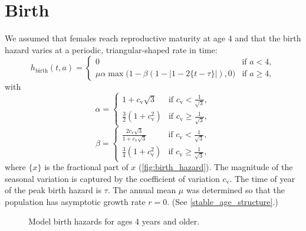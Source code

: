 \documentclass[12pt]{article}
\begin{document}
\section{Birth}

We assumed that females reach reproductive maturity at age $4$ and
that the birth hazard varies at a periodic, triangular-shaped rate in
time:
\begin{equation}
  h_{\text{birth}}(t, a) =
  \begin{cases}
    0 & \text{if $a < 4$},
    \\
    \mu \alpha \max\big(1 - \beta (1 - |1 - 2 \{t - \tau\}|), 0\big)
    & \text{if $a \geq 4$},
  \end{cases}
\end{equation}
with
\begin{equation}
  \alpha =
  \begin{cases}
    1 + c_{\text{v}} \sqrt{3}
    & \text{if $c_{\text{v}} < \frac{1}{\sqrt{3}}$},
    \\
    \frac{3}{2} \left(1 + c_{\text{v}}^2\right)
    & \text{if $c_{\text{v}} \geq \frac{1}{\sqrt{3}}$},
  \end{cases}
\end{equation}
\begin{equation}
  \beta =
  \begin{cases}
    \frac{2 c_{\text{v}} \sqrt{3}}{1 + c_{\text{v}} \sqrt{3}}
    & \text{if $c_{\text{v}} < \frac{1}{\sqrt{3}}$},
    \\
    \frac{3}{4} \left(1 + c_{\text{v}}^2\right)
    & \text{if $c_{\text{v}} \geq \frac{1}{\sqrt{3}}$},
  \end{cases}
\end{equation}
where $\{x\}$ is the fractional part of $x$
(\autoref{fig:birth_hazard}).  The magnitude of the seasonal variation
is captured by the coefficient of variation $c_{\text{v}}$.  The time of year
of the peak birth hazard is $\tau$.  The annual mean $\mu$ was determined
so that the population has asymptotic growth rate $r = 0$.  (See
\autoref{stable_age_structure}.)

\begin{figure}
  \centering
  
  \caption{Model birth hazards for ages 4 years and older.}
  \label{fig:birth_hazard}
\end{figure}
\end{document}
